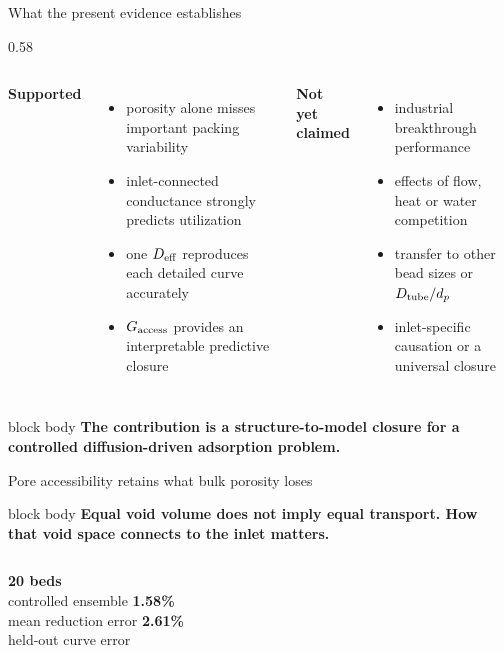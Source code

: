 \documentclass[aspectratio=169,11pt]{beamer}
\newcommand{\hi}[1]{\textcolor{tumblue}{\textbf{#1}}}
\newcommand{\question}[1]{%
  \begin{beamercolorbox}[rounded=true,sep=0.65em]{block body}
  \centering\large\color{tumdark}\textbf{#1}
  \end{beamercolorbox}}
\newcommand{\result}[1]{%
  \begin{beamercolorbox}[rounded=true,sep=0.55em]{block body}
  \centering\color{tumdark}\textbf{#1}
  \end{beamercolorbox}}
\newcommand{\FlexRowHeight}{}
\newenvironment{FlexRow}[1]{%
  \def\FlexRowHeight{#1}\begin{overlayarea}{\textwidth}{#1}\begin{columns}[T,onlytextwidth]
}{\end{columns}\end{overlayarea}}
\newcommand{\Col}[2]{\column{#1\textwidth}\begin{minipage}[t][\FlexRowHeight]{\linewidth}#2\end{minipage}}
\begin{document}
\begin{frame}{What the present evidence establishes}
  \begin{FlexRow}{0.58\textheight}
    \Col{0.47}{
      \hi{Supported}
      \begin{itemize}
        \item porosity alone misses important packing variability
        \item inlet-connected conductance strongly predicts utilization
        \item one $D_{\rm eff}$ reproduces each detailed curve accurately
        \item $G_{\rm access}$ provides an interpretable predictive closure
      \end{itemize}}
    \Col{0.47}{
      \hi{Not yet claimed}
      \begin{itemize}
        \item industrial breakthrough performance
        \item effects of flow, heat or water competition
        \item transfer to other bead sizes or $D_{\rm tube}/d_p$
        \item inlet-specific causation or a universal closure
      \end{itemize}}
  \end{FlexRow}

  \vspace*{0.5cm}
  \result{The contribution is a structure-to-model closure for a controlled diffusion-driven adsorption problem.}
\end{frame}

\begin{frame}{Pore accessibility retains what bulk porosity loses}
  \question{Equal void volume does not imply equal transport. How that void space connects to the inlet matters.}
  \vspace{0.55cm}
  \centering
  \vspace{0.65cm}
  \begin{columns}[T,onlytextwidth]
    \centering\hi{20 beds}\\controlled ensemble
    \centering\hi{1.58\%}\\mean reduction error
    \centering\hi{2.61\%}\\held-out curve error
  \end{columns}
\end{frame}
\end{document}
